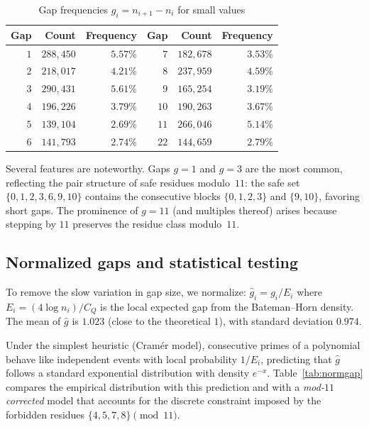 \documentclass[11pt,a4paper]{article}
\theoremstyle{plain}
\theoremstyle{definition}
\theoremstyle{remark}
\begin{document}
\begin{table}[ht]
\centering
\caption{Gap frequencies $g_i = n_{i+1} - n_i$ for small values}
\label{tab:gapfreq}
\smallskip
\begin{tabular}{@{}rrr|rrr@{}}
\toprule
Gap & Count & Frequency & Gap & Count & Frequency \\
\midrule
$1$  & $288{,}450$ & $5.57\%$ & $7$  & $182{,}678$ & $3.53\%$ \\
$2$  & $218{,}017$ & $4.21\%$ & $8$  & $237{,}959$ & $4.59\%$ \\
$3$  & $290{,}431$ & $5.61\%$ & $9$  & $165{,}254$ & $3.19\%$ \\
$4$  & $196{,}226$ & $3.79\%$ & $10$ & $190{,}263$ & $3.67\%$ \\
$5$  & $139{,}104$ & $2.69\%$ & $11$ & $266{,}046$ & $5.14\%$ \\
$6$  & $141{,}793$ & $2.74\%$ & $22$ & $144{,}659$ & $2.79\%$ \\
\bottomrule
\end{tabular}
\end{table}

Several features are noteworthy. Gaps $g = 1$ and $g = 3$ are the most common, reflecting the pair structure of safe residues modulo~$11$: the safe set $\{0, 1, 2, 3, 6, 9, 10\}$ contains the consecutive blocks $\{0,1,2,3\}$ and $\{9,10\}$, favoring short gaps. The prominence of $g = 11$ (and multiples thereof) arises because stepping by $11$ preserves the residue class modulo~$11$.

\subsection{Normalized gaps and statistical testing}

To remove the slow variation in gap size, we normalize: $\hat{g}_i = g_i / E_i$ where $E_i = (4\log n_i)/C_Q$ is the local expected gap from the Bateman--Horn density. The mean of $\hat{g}$ is $1.023$ (close to the theoretical $1$), with standard deviation $0.974$.

Under the simplest heuristic (Cram\'er model), consecutive primes of a polynomial behave like independent events with local probability $1/E_i$, predicting that $\hat{g}$ follows a standard exponential distribution with density $e^{-x}$. Table~\ref{tab:normgap} compares the empirical distribution with this prediction and with a \emph{mod-$11$ corrected} model that accounts for the discrete constraint imposed by the forbidden residues $\{4, 5, 7, 8\} \pmod{11}$.
\end{document}
